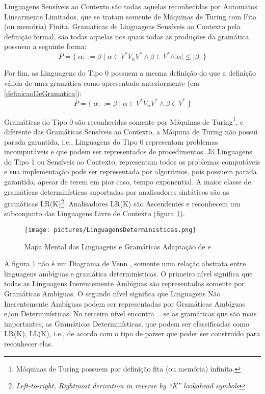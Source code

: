 {    Linguagens Sensíveis ao Contexto são todas aquelas
    reconhecidas por Automatos Linearmente Limitados,
    que se tratam somente de Máquinas de Turing com Fita (ou memória) Finita.
    Gramaticas de Linguagens Sensíveis ao Contexto pela definição formal,
    são todas aquelas nos quais todas as produções da gramática possuem a seguinte forma:
    $$ P = \{\; \alpha ::= \beta \;|\; \alpha \in V^* V_n V^* \land \beta \in V^*
                \land \vert\alpha\vert \leq \vert\beta\vert \;\} $$

    Por fim,
    as Linguagens do Tipo 0 possuem a mesma definição do que a definição válida de
    uma gramática como apresentado anteriormente (em \ref{definicaoDeGramatica}):
    $$ P = \{\; \alpha ::= \beta \;|\; \alpha \in V^* V_n V^* \land \beta \in V^* \;\} $$

    Gramáticas do Tipo 0 são reconhecidas somente por Máquinas de Turing\footnote{Máquinas
    de Turing possuem por definição fita (ou memória) infinita.
    },
    e diferente das Gramáticas Sensíveis ao Contexto,
    a Máquina de Turing não possui parada garantida,
    i.e.,
    Linguagens do Tipo 0 representam problemas incomputáveis e
    que podem ser representados de procedimentos.
    Já Linguagens do Tipo 1 ou Sensíveis ao Contexto,
    representam todos os problemas computáveis e
    sua implementação pode ser representada por algoritmos,
    pois possuem parada garantida,
    apesar de terem em pior caso,
    tempo exponential.
    A maior classe de gramáticas determinísticas suportadas por analisadores
    sintáticos são as gramáticas LR(K)\footnote{\textit{Left-to-right,
    Rightmost derivation in reverse by ``K'' lookahead symbols
    }}.
    Analisadores LR(K) \cite{ahoCompilerDragonBook} são Ascendentes e
    reconhecem um subconjunto das Linguagens Livre de Contexto
    (figura \ref{fig:pictures/LinguagensDeterministicas.png}).
    \begin{figure}[H]
    \centering
    \texttt{[image: pictures/LinguagensDeterministicas.png]}
    \caption{Mapa Mental das Linguagens e
    Gramáticas \newline Adaptação de  e
    }
    \label{fig:pictures/LinguagensDeterministicas.png}
    \end{figure}

    A figura \ref{fig:pictures/LinguagensDeterministicas.png} não é
    um Diagrama de Venn \cite{generalizedVennDiagrams},
    somente uma relação abstrata entre linguagens ambíguas e
    gramática determinísticas.
    O primeiro nível significa que todas as Linguagens Inerentemente
    Ambíguas são representadas somente por Gramáticas Ambíguas.
    O segundo nível significa que Linguagens Não Inerentemente Ambíguas podem
    ser representadas por Gramáticas Ambíguas e/ou Determinísticas.
    No terceiro nível encontra~=se as gramáticas que são mais importantes,
    as Gramáticas Determinísticas,
    que podem ser classificadas como LR(K),
    LL(K), i.e.,
    de acordo com o tipo de parser que poder ser construído para reconhecer elas.

}
